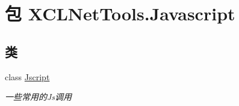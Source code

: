 \hypertarget{namespace_x_c_l_net_tools_1_1_javascript}{\section{包 X\-C\-L\-Net\-Tools.\-Javascript}
\label{namespace_x_c_l_net_tools_1_1_javascript}
}
\subsection*{类}
\begin{DoxyCompactItemize}
\item 
class \hyperlink{class_x_c_l_net_tools_1_1_javascript_1_1_jscript}{Jscript}
\begin{DoxyCompactList}\small\item\em 一些常用的\-Js调用 \end{DoxyCompactList}\end{DoxyCompactItemize}
